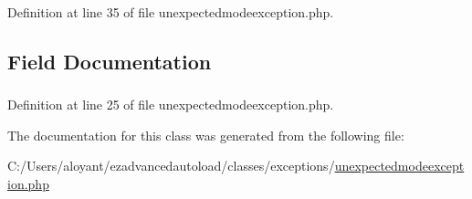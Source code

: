 Definition at line 35 of file unexpectedmodeexception.\-php.



\subsection{Field Documentation}
\hypertarget{classextension_1_1ezadvancedautoload_1_1classes_1_1exceptions_1_1unexpected_mode_exception_a884548141df89038db6e6fca2765f2bc}{
\subsubsection[{\$mode}]{}}\label{classextension_1_1ezadvancedautoload_1_1classes_1_1exceptions_1_1unexpected_mode_exception_a884548141df89038db6e6fca2765f2bc}


Definition at line 25 of file unexpectedmodeexception.\-php.



The documentation for this class was generated from the following file\-:\begin{DoxyCompactItemize}
\item 
C\-:/\-Users/aloyant/ezadvancedautoload/classes/exceptions/\hyperlink{unexpectedmodeexception_8php}{unexpectedmodeexception.\-php}\end{DoxyCompactItemize}

